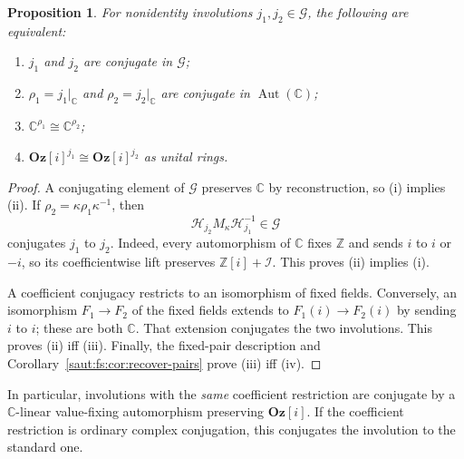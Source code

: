 \documentclass[11pt]{article}
\newtheorem{proposition}[theorem]{Proposition}
\theoremstyle{definition}
\theoremstyle{remark}
\newcommand{\C}{\mathbb C}
\newcommand{\Z}{\mathbb Z}
\newcommand{\Aut}{\operatorname{Aut}}
\newcommand{\Oz}{\mathbf{Oz}}
\newcommand{\Ineg}{\mathcal I}
\numberwithin{equation}{section}
\begin{document}
\begin{proposition}\label{saut:fs:prop:conjugacy}
For nonidentity involutions $j_1,j_2\in\mathcal G$, the following are equivalent:
\begin{enumerate}[label=(\roman*)]
\item $j_1$ and $j_2$ are conjugate in $\mathcal G$;
\item $\rho_1=j_1|_\C$ and $\rho_2=j_2|_\C$ are conjugate in $\Aut(\C)$;
\item $\C^{\rho_1}\cong\C^{\rho_2}$;
\item $\Oz[i]^{j_1}\cong\Oz[i]^{j_2}$ as unital rings.
\end{enumerate}
\end{proposition}
\begin{proof}
A conjugating element of $\mathcal G$ preserves $\C$ by reconstruction, so (i) implies
(ii). If $\rho_2=\kappa\rho_1\kappa^{-1}$, then
\[
 \mathcal H_{j_2}M_\kappa\mathcal H_{j_1}^{-1}\in\mathcal G
\]
conjugates $j_1$ to $j_2$. Indeed, every automorphism of $\C$ fixes $\Z$ and sends
$i$ to $i$ or $-i$, so its coefficientwise lift preserves $\Z[i]+\Ineg$. This proves
(ii) implies (i).

A coefficient conjugacy restricts to an isomorphism of fixed fields. Conversely, an
isomorphism $F_1\to F_2$ of the fixed fields extends to $F_1(i)\to F_2(i)$ by sending
$i$ to $i$; these are both $\C$. That extension conjugates the two involutions. This
proves (ii) iff (iii). Finally, the fixed-pair description and
Corollary~\ref{saut:fs:cor:recover-pairs} prove (iii) iff (iv).
\end{proof}

In particular, involutions with the \emph{same} coefficient restriction are conjugate
by a $\C$-linear value-fixing automorphism preserving $\Oz[i]$. If the coefficient
restriction is ordinary complex conjugation, this conjugates the involution to the
standard one.
\end{document}
